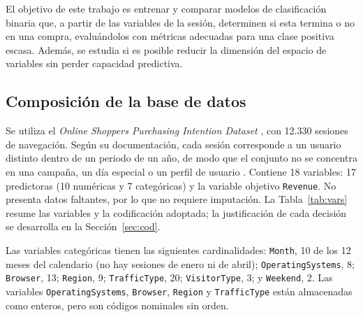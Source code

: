 \documentclass[conference]{IEEEtran}
\begin{document}
El objetivo de este trabajo es entrenar y comparar modelos de clasificación binaria que, a partir de las variables de la sesión, determinen si esta termina o no en una compra, evaluándolos con métricas adecuadas para una clase positiva escasa. Además, se estudia si es posible reducir la dimensión del espacio de variables sin perder capacidad predictiva.

\subsection{Composición de la base de datos}
Se utiliza el \emph{Online Shoppers Purchasing Intention Dataset} \cite{uci2018}, con 12.330 sesiones de navegación. Según su documentación, cada sesión corresponde a un usuario distinto dentro de un periodo de un año, de modo que el conjunto no se concentra en una campaña, un día especial o un perfil de usuario \cite{uci2018}. Contiene 18 variables: 17 predictoras (10 numéricas y 7 categóricas) y la variable objetivo \texttt{Revenue}. No presenta datos faltantes, por lo que no requiere imputación. La Tabla~\ref{tab:vars} resume las variables y la codificación adoptada; la justificación de cada decisión se desarrolla en la Sección~\ref{sec:cod}.

Las variables categóricas tienen las siguientes cardinalidades: \texttt{Month}, 10 de los 12 meses del calendario (no hay sesiones de enero ni de abril); \texttt{OperatingSystems}, 8; \texttt{Browser}, 13; \texttt{Region}, 9; \texttt{TrafficType}, 20; \texttt{VisitorType}, 3; y \texttt{Weekend}, 2. Las variables \texttt{OperatingSystems}, \texttt{Browser}, \texttt{Region} y \texttt{TrafficType} están almacenadas como enteros, pero son códigos nominales sin orden.
\end{document}
